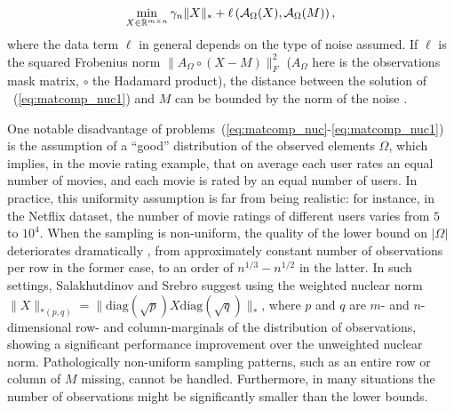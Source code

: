 \documentclass{article}
\begin{document}
\vspace{-0.3cm}
\begin{eqnarray}
\min_{X \in \mathbb{R}^{m\times n}}	\gamma_n \|X\|_*  +  \ell\left({\cal A}_{\Omega} (X),{\cal A}_{\Omega}(M)\right)  ,
\label{eq:matcomp_nuc1}
\end{eqnarray}
where the data term $\ell$ in general depends on the type of noise assumed. If $\ell$ is the squared Frobenius norm $\|A_\Omega\circ (X-M)\|_F^2$ ($A_\Omega$ here is the observations mask matrix, $\circ$ the Hadamard product), the distance between the solution of ~(\ref{eq:matcomp_nuc1}) and $M$ can be bounded by the norm of the noise \cite{candes2010matrix}. 

One notable disadvantage of problems~(\ref{eq:matcomp_nuc}-\ref{eq:matcomp_nuc1}) is the assumption of a ``good'' distribution of the observed elements $\Omega$, which implies, in the movie rating example, that on average each user rates an equal number of movies, and each movie is rated by an equal number of users. In practice, this uniformity assumption is far from being realistic: for instance, in the Netflix dataset, the number of movie ratings of different users varies from $5$ to $10^4$. When the sampling is non-uniform, the quality of the lower bound on $|\Omega|$ deteriorates dramatically \cite{salakhutdinov2010collaborative}, from approximately constant number of observations per row in the former case, to an order of $n^{1/3} - n^{1/2}$ in the latter. In such settings, Salakhutdinov and Srebro \cite{salakhutdinov2010collaborative} suggest using the weighted nuclear norm $\| X \|_{*(p,q)} = \| \mathrm{diag}(\sqrt{p}) X \mathrm{diag}(\sqrt{q}) \|_*$, where $p$ and $q$ are $m$- and $n$- dimensional row- and column-marginals of the distribution of observations, showing a significant performance improvement over the unweighted nuclear norm. Pathologically non-uniform sampling patterns, such as an entire row or column of $M$ missing, cannot be handled. Furthermore, in many situations the number of observations might be significantly smaller than the lower bounds. 
\end{document}
